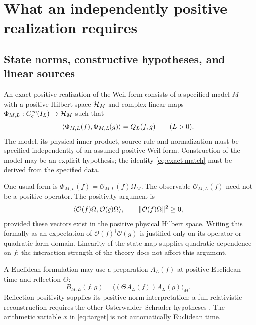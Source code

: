 \section{What an independently positive realization requires}\label{sec:positive}
\subsection{State norms, constructive hypotheses, and linear sources}
\begin{definition}\label{def:realization}
An exact positive realization of the Weil form consists of a specified
model $M$ with a positive Hilbert space $\mathcal H_M$ and complex-linear maps
$\Phi_{M,L}:C_c^\infty(I_L)\to\mathcal H_M$ such that
\begin{equation}\label{eq:exact-match}
 \langle \Phi_{M,L}(f),\Phi_{M,L}(g)\rangle=Q_L(f,g)
 \qquad (L>0).
\end{equation}
The model, its physical inner product, source rule and normalization
must be specified independently of an assumed positive Weil form.
Construction of the model may be an explicit hypothesis; the identity
\eqref{eq:exact-match} must be derived from the specified data.
\end{definition}

One usual form is $\Phi_{M,L}(f)=\mathcal O_{M,L}(f)\Omega_M$.
The observable $\mathcal O_{M,L}(f)$ need not be a positive operator.
The positivity argument is
\begin{equation}\label{eq:observable-norm}
 \langle \mathcal O(f)\Omega,\mathcal O(g)\Omega\rangle,
 \qquad \lVert \mathcal O(f)\Omega\rVert^2\geq0,
\end{equation}
provided these vectors exist in the positive physical Hilbert space.
Writing this formally as an expectation of $\mathcal O(f)^\dagger
\mathcal O(g)$ is justified only on its operator or quadratic-form
domain. Linearity of the state map supplies quadratic dependence on $f$;
the interaction strength of the theory does not affect this argument.

A Euclidean formulation may use a preparation $A_L(f)$ at positive
Euclidean time and reflection $\Theta$:
\begin{equation}\label{eq:os}
 B_{M,L}(f,g)=\langle(\Theta A_L(f))A_L(g)\rangle_M.
\end{equation}
Reflection positivity supplies its positive norm interpretation; a full
relativistic reconstruction requires the other Osterwalder--Schrader
hypotheses \cite{OS}. The arithmetic variable $x$ in
\eqref{eq:target} is not automatically Euclidean time.

